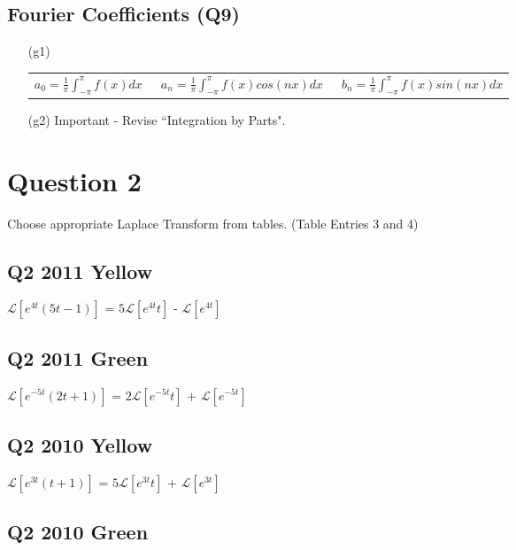 \documentclass[11pt,a4paper,titlepage,oneside,openany]{article}
\numberwithin{equation}{section}
\numberwithin{algorithm}{section}
\numberwithin{figure}{section}
\numberwithin{table}{section}
\begin{document}
\subsection*{Fourier Coefficients (Q9)}
\begin{itemize}
\item[(g1)]

\begin{tabular}{lcr}

  $a_0 = \frac{1}{\pi}\int^{\pi }_{-\pi} f(x) dx$ & \mbox{     }$ a_n = \frac{1}{\pi}\int^{\pi }_{-\pi} f(x) cos(nx) dx $ & \mbox{     }$b_n = \frac{1}{\pi}\int^{\pi }_{-\pi} f(x) sin(nx) dx$ \\

\end{tabular}
\item[(g2)] Important - Revise ``Integration by Parts".
\end{itemize}
\newpage




\section*{Question 2}
Choose appropriate Laplace Transform from tables. (Table Entries 3 and 4)
\subsection*{Q2 2011 Yellow}
$\mathcal{L}[e^{4t}(5t-1)]$ = $5\mathcal{L}[e^{4t}t]$ - $\mathcal{L}[e^{4t}]$
\subsection*{Q2 2011 Green}
$\mathcal{L}[e^{-5t}(2t+1)]$ = $2\mathcal{L}[e^{-5t}t]$ + $\mathcal{L}[e^{-5t}]$
\subsection*{Q2 2010 Yellow}

$\mathcal{L}[e^{3t}(t+1)]$ = $5\mathcal{L}[e^{3t}t]$ + $\mathcal{L}[e^{3t}]$
\subsection*{Q2 2010 Green}
\end{document}
